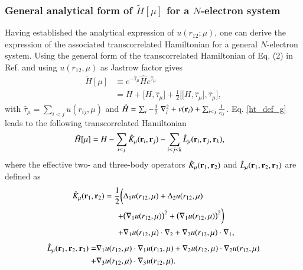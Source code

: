 \documentclass[aip,jcp,reprint,noshowkeys,superscriptaddress]{revtex4-1}
\newcommand{\br}[0]{{\bf {r}}}
\newcommand{\bri}[1]{{\bf r}_{#1}}
\begin{document}
\subsubsection{General analytical form of $\tilde{H}[\mu]$ for a $N$-electron system}
Having established the analytical expression of $u(r_{12};\mu)$, one can derive the expression of the associated transcorrelated Hamiltonian for a general $N$-electron system.  
Using the general form of the transcorrelated Hamiltonian of Eq. (2) in Ref.  and using $u(r_{12},\mu)$ as Jastrow factor gives 
\begin{equation}
 \begin{aligned}
 \label{ht_def_g}
 \tilde{H}[\mu] &\equiv e^{-\hat{\tau}_\mu} \hat{H} e^{\hat{\tau}_\mu} \\ 
                &= H + \big[ H,\hat{\tau}_\mu \big] + \frac{1}{2}\bigg[ \big[H,\hat{\tau}_\mu\big],\hat{\tau}_\mu\bigg],
 \end{aligned}
\end{equation}
with $\hat{\tau}_\mu = \sum_{i<j}u(r_{ij},\mu)$ and $\hat{H} = \sum_i -\frac{1}{2} \nabla^2_i + v(\br{}_i) + \sum_{i<j} \frac{1}{r_{ij}}$. 
Eq. \eqref{ht_def_g} leads to the following transcorrelated Hamiltonian 
\begin{equation}
 \begin{aligned}
 \label{ht_def_gu}
 \tilde{H}[\mu] & = H - \sum_{i<j} \hat{K}_\mu(\bri{i},\bri{j}) - \sum_{i<j<k} \hat{L}_\mu(\bri{i},\bri{j},\bri{k}),
 \end{aligned}
\end{equation}
where the effective two- and three-body operators $\hat{K}_\mu(\bri{1},\bri{2})$ and $\hat{L}_\mu(\bri{1},\bri{2},\bri{3})$ are defined as
\begin{equation}
 \begin{aligned}
 \label{def_k}
  \hat{K}_\mu(\bri{1},\bri{2})  = \frac{1}{2} \bigg( &\Delta_1 u(r_{12},\mu) + \Delta_2 u(r_{12},\mu) \\
                                               + &\big(\nabla_1 u(r_{12},\mu) \big) ^2 + \big(\nabla_1 u(r_{12},\mu) \big) ^2 \bigg) \\
                                               + &\nabla_1 u(r_{12},\mu) \cdot \nabla_2 + \nabla_2 u(r_{12},\mu)\cdot \nabla_1,
 \end{aligned}
\end{equation}
\begin{equation}
 \begin{aligned}
 \label{def_k}
  \hat{L}_\mu(\bri{1},\bri{2},\bri{3})  = & \nabla_1 u(r_{12},\mu) \cdot \nabla_1 u(r_{13},\mu) + \nabla_2 u(r_{12},\mu) \cdot \nabla_2 u(r_{12},\mu)  \\
                                     + & \nabla_3 u(r_{12},\mu) \cdot \nabla_3 u(r_{12},\mu).
 \end{aligned}
\end{equation}
\end{document}
